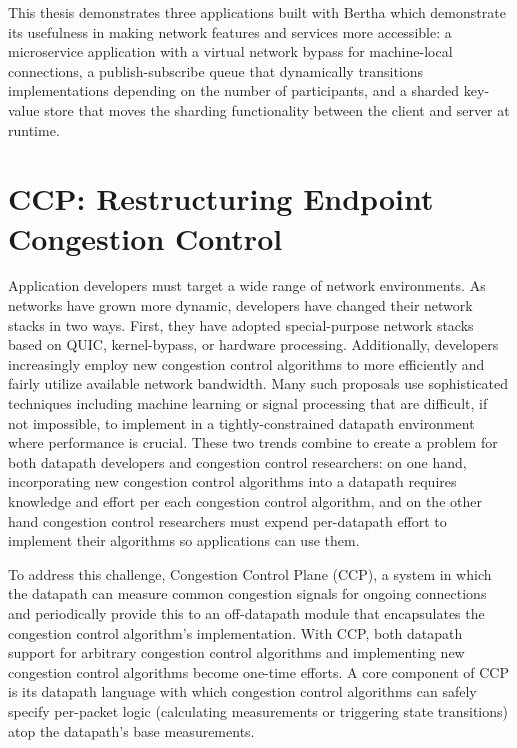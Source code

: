 This thesis demonstrates three applications built with Bertha which demonstrate its usefulness in making network features and services more accessible: a microservice application with a virtual network bypass for machine-local connections, a publish-subscribe queue that dynamically transitions implementations depending on the number of participants, and a sharded key-value store that moves the sharding functionality between the client and server at runtime.

\section{CCP: Restructuring Endpoint Congestion Control}

Application developers must target a wide range of network environments. As networks have grown more dynamic, developers have changed their network stacks in two ways.
First, they have adopted special-purpose network stacks based on QUIC, kernel-bypass, or hardware processing.
Additionally, developers increasingly employ new congestion control algorithms to more efficiently and fairly utilize available network bandwidth. Many such proposals use sophisticated techniques including machine learning or signal processing that are difficult, if not impossible, to implement in a tightly-constrained datapath environment where performance is crucial. 
These two trends combine to create a problem for both datapath developers and congestion control researchers: on one hand, incorporating new congestion control algorithms into a datapath requires knowledge and effort per each congestion control algorithm, and on the other hand congestion control researchers must expend per-datapath effort to implement their algorithms so applications can use them.

To address this challenge, Congestion Control Plane (CCP), a system in which the datapath can measure common congestion signals for ongoing connections and periodically provide this to an off-datapath module that encapsulates the congestion control algorithm's implementation. With CCP, both datapath support for arbitrary congestion control algorithms and implementing new congestion control algorithms become one-time efforts.
A core component of CCP is its datapath language with which congestion control algorithms can safely specify per-packet logic (\eg calculating measurements or triggering state transitions) atop the datapath's base measurements.


